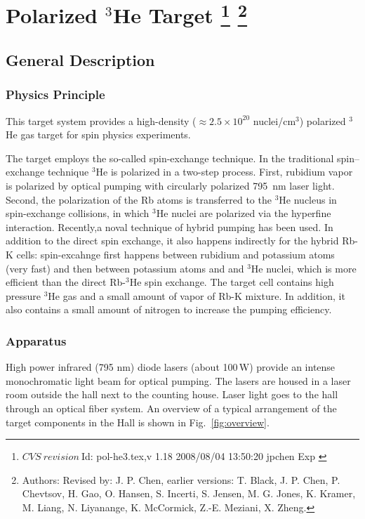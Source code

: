\chapter[Polarized $^3$He Target]{Polarized $^3$He Target
\footnote{
  $CVS~revision~ $Id: pol-he3.tex,v 1.18 2008/08/04 13:50:20 jpchen Exp $ $
}
\footnote{Authors: Revised by: J. P. Chen, earlier versions: 
T. Black, J. P. Chen, P. Chevtsov, H. Gao, 
O. Hansen, S. Incerti, S. Jensen, M. G. Jones, K. Kramer, M. Liang, 
N. Liyanange, K. McCormick, Z.-E. Meziani, X. Zheng.
}
}

\section{General Description}
\label{sec:target-he3-general}
\subsection{Physics Principle}

This target system provides a high-density 
($\approx 2.5\times 10^{20}$ nuclei/cm$^3$)
polarized $^3$He gas target for spin physics experiments. 

The target employs the so-called spin-exchange technique.
In the traditional spin--exchange technique $^3$He is polarized in 
a two-step process.
First, rubidium vapor is polarized by optical pumping with
circularly polarized 795~nm laser light. Second, the polarization
of the Rb atoms is transferred to the $^3$He nucleus in spin-exchange
collisions, in which $^3$He nuclei are polarized via the hyperfine interaction.
Recently,a noval technique of hybrid pumping has been used.  
In addition to the direct spin exchange, it also happens indirectly for the 
hybrid Rb-K cells: spin-excahnge first happens between rubidium and potassium atoms 
(very fast) and 
then between potassium atoms and and $^3$He nuclei, which is more efficient 
than the direct Rb-$^3$He spin exchange.
The target cell contains high pressure $^3$He gas and a small amount of
vapor of Rb-K mixture. 
In addition, it
also contains a small amount of nitrogen to increase the
pumping efficiency.

\subsection{Apparatus}

High power infrared (795 nm) diode lasers (about 100\,W) provide an intense 
monochromatic
light beam for optical pumping. 
The lasers are housed in a laser room
outside the hall next to the counting house. Laser light goes to the hall 
through an optical fiber system.  An overview of a
typical arrangement of the target components in the Hall is shown in
Fig.~\ref{fig:overview}.

